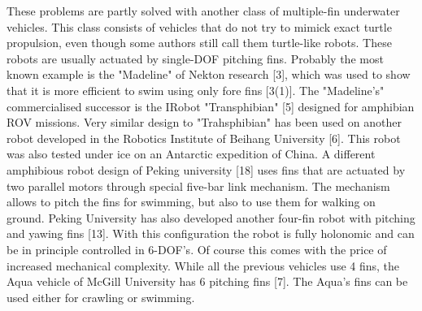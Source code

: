 \documentclass[conference]{IEEEtran}
\begin{document}
These problems are partly solved with another class of multiple-fin underwater vehicles. This class consists of vehicles that do not try to mimick exact turtle propulsion, even though some authors still call them turtle-like robots. These robots are usually actuated by single-DOF pitching fins. Probably the most known example is the "Madeline" of Nekton research [3], which was used to show that it is more efficient to swim using only fore fins [3(1)]. The "Madeline's" commercialised successor is the IRobot "Transphibian" [5] designed for amphibian ROV missions. Very similar design to "Trahsphibian" has been used on another robot developed in the Robotics Institute of Beihang University [6]. This robot was also tested under ice on an Antarctic expedition of China. A different amphibious robot design of Peking university [18] uses fins that are actuated by two parallel motors through special five-bar link mechanism. The mechanism allows to pitch the fins for swimming, but also to use them for walking on ground. Peking University has also developed another four-fin robot with pitching and yawing fins [13]. With this configuration the robot is fully holonomic and can be in principle controlled in 6-DOF's. Of course this comes with the price of increased mechanical complexity. While all the previous vehicles use 4 fins, the Aqua vehicle of McGill University has 6 pitching fins [7]. The Aqua's fins can be used either for crawling or swimming.
\end{document}
